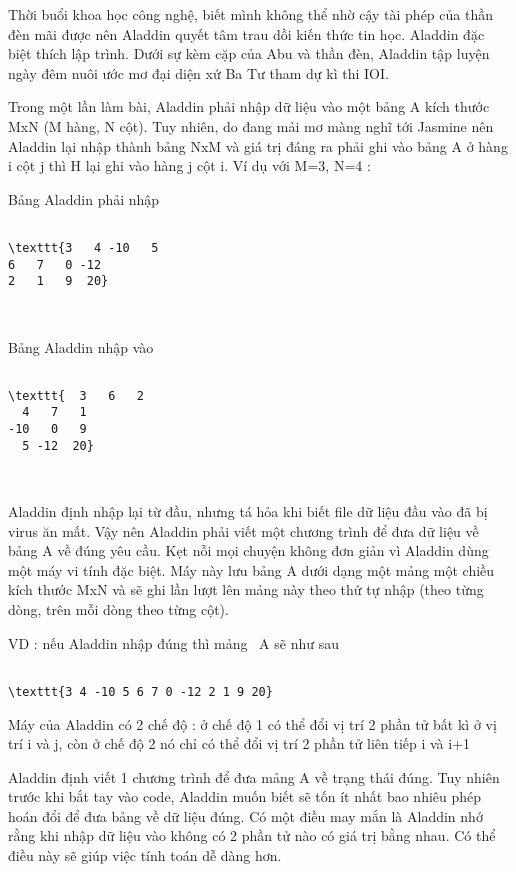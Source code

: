 

Thời buổi khoa học công nghệ, biết mình không thể nhờ cậy tài phép của thần đèn mãi được nên Aladdin quyết tâm trau dồi kiến thức tin học. Aladdin đặc biệt thích lập trình. Dưới sự kèm cặp của Abu và thần đèn, Aladdin tập luyện ngày đêm nuôi ước mơ đại diện xứ Ba Tư tham dự kì thi IOI.

Trong một lần làm bài, Aladdin phải nhập dữ liệu vào một bảng A kích thước MxN (M hàng, N cột). Tuy nhiên, do đang mải mơ màng nghĩ tới Jasmine nên Aladdin lại nhập thành bảng NxM và giá trị đáng ra phải ghi vào bảng A ở hàng i cột j thì H lại ghi vào hàng j cột i. Ví dụ với M=3, N=4 :

Bảng Aladdin phải nhập
\begin{verbatim}

\texttt{3   4 -10   5
6   7   0 -12
2   1   9  20}\end{verbatim}

 

Bảng Aladdin nhập vào
\begin{verbatim}

\texttt{  3   6   2
  4   7   1
-10   0   9
  5 -12  20}\end{verbatim}

 

Aladdin định nhập lại từ đầu, nhưng tá hỏa khi biết file dữ liệu đầu vào đã bị virus ăn mất. Vậy nên Aladdin phải viết một chương trình để đưa dữ liệu về bảng A về đúng yêu cầu. Kẹt nỗi mọi chuyện không đơn giản vì Aladdin dùng một máy vi tính đặc biệt. Máy này lưu bảng A dưới dạng một mảng một chiều kích thước MxN và sẽ ghi lần lượt lên mảng này theo thứ tự nhập (theo từng dòng, trên mỗi dòng theo từng cột).

VD : nếu Aladdin nhập đúng thì mảng  A sẽ như sau
\begin{verbatim}

\texttt{3 4 -10 5 6 7 0 -12 2 1 9 20}\end{verbatim}

Máy của Aladdin có 2 chế độ : ở chế độ 1 có thể đổi vị trí 2 phần tử bất kì ở vị trí i và j, còn ở chế độ 2 nó chỉ có thể đổi vị trí 2 phần tử liên tiếp i và i+1

Aladdin định viết 1 chương trình để đưa mảng A về trạng thái đúng. Tuy nhiên trước khi bắt tay vào code, Aladdin muốn biết sẽ tốn ít nhất bao nhiêu phép hoán đổi để đưa bảng về dữ liệu đúng. Có một điều may mắn là Aladdin nhớ rằng khi nhập dữ liệu vào không có 2 phần tử nào có giá trị bằng nhau. Có thể điều này sẽ giúp việc tính toán dễ dàng hơn.




